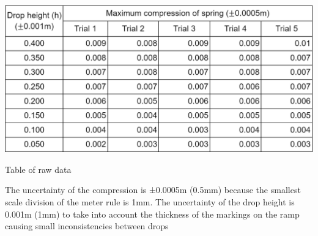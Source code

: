 \begin{table}[!htb]
    \includegraphics[width = \textwidth]{rawtbl.png}
    \caption{Table of raw data}
\end{table}
\FloatBarrier
The uncertainty of the compression is ±0.0005m (0.5mm) because the smallest scale division of the meter rule is 1mm. The uncertainty of the drop height is 0.001m (1mm) to take into account the thickness of the markings on the ramp causing small inconsistencies between drops